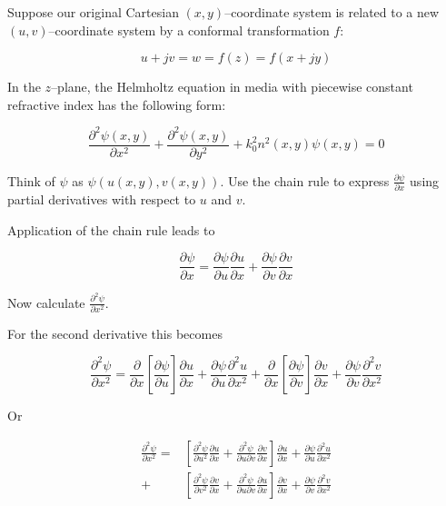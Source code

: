 Suppose our original Cartesian $(x,y)$--coordinate system is related to a new $(u,v)$--coordinate system by a conformal transformation $f$:

\begin{equation}
u+jv = w = f(z) = f(x+jy)
\end{equation} 

In the $z$--plane, the Helmholtz equation in media with piecewise constant refractive index has the following form:

\begin{equation}
\frac{\partial^2 \psi(x,y)}{\partial x^2} + \frac{\partial^2 \psi(x,y)}{\partial y^2} + k_0^2 n^2(x,y) \psi(x,y) = 0
\end{equation}

\begin{cue}
Think of $\psi$ as $\psi\left(u(x,y), v(x,y)\right)$. Use the chain rule to express $\frac{\partial \psi}{\partial x}$ using partial derivatives with respect to $u$ and $v$.
\end{cue}

\noindent{}Application of the chain rule leads to

\begin{equation}
\frac{\partial \psi}{\partial x} = \frac{\partial \psi}{\partial u}
\frac{\partial u}{\partial x} + \frac{\partial \psi}{\partial v} \frac{\partial
v}{\partial x}
\end{equation} 


\begin{cue}
Now calculate $\frac{\partial^2 \psi}{\partial x^2}$.
\end{cue}

For the second derivative this becomes

\begin{equation}
\frac{\partial^2 \psi}{\partial x^2} = \frac{\partial}{\partial x} \left[
\frac{\partial \psi}{\partial u}\right]  \frac{\partial u}{\partial x} +
\frac{\partial \psi}{\partial u}\frac{\partial^2 u}{\partial x^2} +  
\frac{\partial}{\partial x} \left[ \frac{\partial \psi}{\partial v}\right] 
\frac{\partial v}{\partial x}  + \frac{\partial \psi}{\partial
v}\frac{\partial^2 v}{\partial x^2}
\end{equation} 

Or

\begin{align}
\frac{\partial^2 \psi}{\partial x^2} = &\left[ \frac{\partial^2 \psi}{\partial u^2 } \frac{\partial u}{\partial x} +  \frac{\partial^2 \psi}{\partial u \partial v} \frac{\partial v}{\partial x} \right] \frac{\partial u}{\partial x}  + \frac{\partial \psi}{\partial u}\frac{\partial^2 u}{\partial x^2} \nonumber \\ 
+ &\left[ \frac{\partial^2 \psi}{\partial v^2 } \frac{\partial v}{\partial x} + 
\frac{\partial^2 \psi}{\partial u \partial v} \frac{\partial u}{\partial x}
\right] \frac{\partial v}{\partial x} + \frac{\partial \psi}{\partial v}\frac{\partial^2 v}{\partial x^2}
\end{align} 

